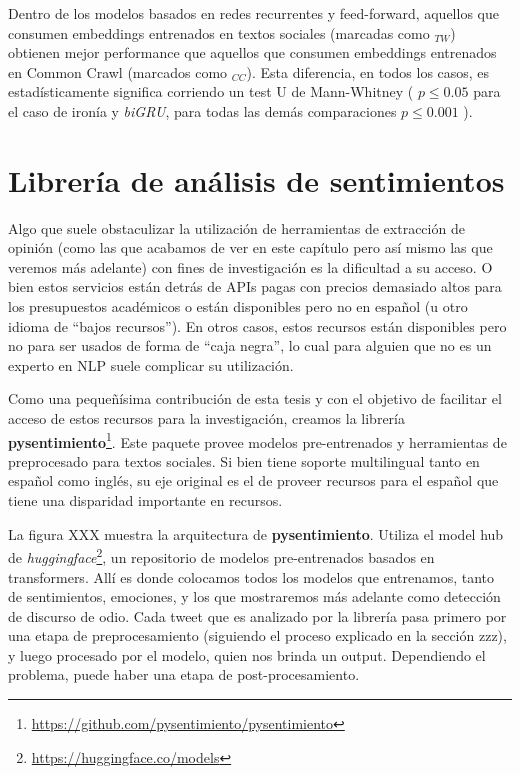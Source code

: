 Dentro de los modelos basados en redes recurrentes y feed-forward, aquellos que consumen embeddings entrenados en textos sociales (marcadas como $_{TW}$) obtienen mejor performance que aquellos que consumen embeddings entrenados en Common Crawl (marcados como $_{CC}$). Esta diferencia, en todos los casos, es estadísticamente significa corriendo un test U de Mann-Whitney ( $p \leq 0.05$ para el caso de ironía y \emph{biGRU}, para todas las demás comparaciones $p \leq 0.001$ ).




\section{Librería de análisis de sentimientos}

\newcommand{\pysentimiento}[0]{\textbf{pysentimiento}}

Algo que suele obstaculizar la utilización de herramientas de extracción de opinión (como las que acabamos de ver en este capítulo pero así mismo las que veremos más adelante) con fines de investigación es la dificultad a su acceso. O bien estos servicios están detrás de APIs pagas con precios demasiado altos para los presupuestos académicos o están disponibles pero no en español (u otro idioma de ``bajos recursos''). En otros casos, estos recursos están disponibles pero no para ser usados de forma de ``caja negra'', lo cual para alguien que no es un experto en NLP suele complicar su utilización.

Como una pequeñísima contribución de esta tesis y con el objetivo de facilitar el acceso de estos recursos para la investigación, creamos la librería \textbf{pysentimiento}\footnote{\url{https://github.com/pysentimiento/pysentimiento}}. Este paquete provee modelos pre-entrenados y herramientas de preprocesado para textos sociales. Si bien tiene soporte multilingual tanto en español como inglés, su eje original es el de proveer recursos para el español que tiene una disparidad importante en recursos.

La figura XXX muestra la arquitectura de \pysentimiento{}. Utiliza el model hub de \emph{huggingface}\footnote{\url{https://huggingface.co/models}}, un repositorio de modelos pre-entrenados basados en transformers. Allí es donde colocamos todos los modelos que entrenamos, tanto de sentimientos, emociones, y los que mostraremos más adelante como detección de discurso de odio. Cada tweet que es analizado por la librería pasa primero por una etapa de preprocesamiento (siguiendo el proceso explicado en la sección zzz), y luego procesado por el modelo, quien nos brinda un output. Dependiendo el problema, puede haber una etapa de post-procesamiento.

